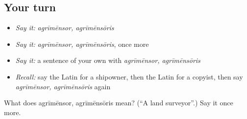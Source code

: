 \subsection*{Your turn}
\begin{itemize}
\raggedright
  \item \emph{Say it:} \emph{agrīmēnsor, agrīmēnsōris}
  \item \emph{Say it:} \emph{agrīmēnsor, agrīmēnsōris}, once more
  \item \emph{Say it:} a sentence of your own with \emph{agrīmēnsor, agrīmēnsōris}
  \item \emph{Recall:} say the Latin for a shipowner, then the Latin for a copyist, then say \emph{agrīmēnsor, agrīmēnsōris} again
\end{itemize}

\begin{tcolorbox}[breakable,colback=teal!4,colframe=teal!35!black,title={Before you move on}]
What does agrīmēnsor, agrīmēnsōris mean? (\textquotedblleft{}A land surveyor\textquotedblright{}.) Say it once more.
\end{tcolorbox}
